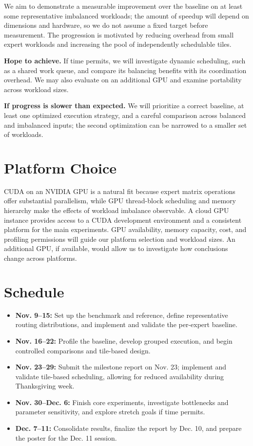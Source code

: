 \documentclass[11pt]{article}
\begin{document}
We aim to demonstrate a measurable improvement over the baseline on at least some representative imbalanced workloads; the amount of speedup will depend on dimensions and hardware, so we do not assume a fixed target before measurement. The progression is motivated by reducing overhead from small expert workloads and increasing the pool of independently schedulable tiles.

\textbf{Hope to achieve.} If time permits, we will investigate dynamic scheduling, such as a shared work queue, and compare its balancing benefits with its coordination overhead. We may also evaluate on an additional GPU and examine portability across workload sizes.

\textbf{If progress is slower than expected.} We will prioritize a correct baseline, at least one optimized execution strategy, and a careful comparison across balanced and imbalanced inputs; the second optimization can be narrowed to a smaller set of workloads.
\section*{Platform Choice}
CUDA on an NVIDIA GPU is a natural fit because expert matrix operations offer substantial parallelism, while GPU thread-block scheduling and memory hierarchy make the effects of workload imbalance observable. A cloud GPU instance provides access to a CUDA development environment and a consistent platform for the main experiments. GPU availability, memory capacity, cost, and profiling permissions will guide our platform selection and workload sizes. An additional GPU, if available, would allow us to investigate how conclusions change across platforms.
\section*{Schedule}
\begin{itemize}
\item \textbf{Nov. 9--15:} Set up the benchmark and reference, define representative routing distributions, and implement and validate the per-expert baseline.
\item \textbf{Nov. 16--22:} Profile the baseline, develop grouped execution, and begin controlled comparisons and tile-based design.
\item \textbf{Nov. 23--29:} Submit the milestone report on Nov. 23; implement and validate tile-based scheduling, allowing for reduced availability during Thanksgiving week.
\item \textbf{Nov. 30--Dec. 6:} Finish core experiments, investigate bottlenecks and parameter sensitivity, and explore stretch goals if time permits.
\item \textbf{Dec. 7--11:} Consolidate results, finalize the report by Dec. 10, and prepare the poster for the Dec. 11 session.
\end{itemize}
\end{document}
